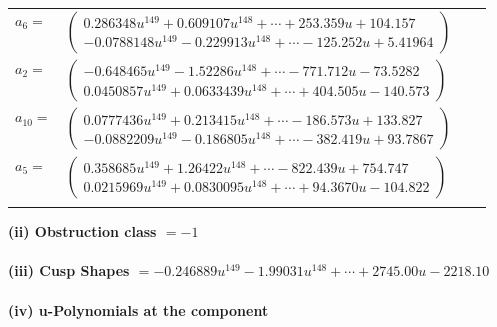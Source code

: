 \documentclass[1p]{elsarticle_modified}
\theoremstyle{definition}
\begin{document}
\begin{tabular}{m{7pt} m{180pt} m{7pt} m{180pt} }
\flushright $a_{6}=$&$\begin{pmatrix}0.286348 u^{149}+0.609107 u^{148}+\cdots+253.359 u+104.157\\-0.0788148 u^{149}-0.229913 u^{148}+\cdots-125.252 u+5.41964\end{pmatrix}$ \\
\flushright $a_{2}=$&$\begin{pmatrix}-0.648465 u^{149}-1.52286 u^{148}+\cdots-771.712 u-73.5282\\0.0450857 u^{149}+0.0633439 u^{148}+\cdots+404.505 u-140.573\end{pmatrix}$ \\
\flushright $a_{10}=$&$\begin{pmatrix}0.0777436 u^{149}+0.213415 u^{148}+\cdots-186.573 u+133.827\\-0.0882209 u^{149}-0.186805 u^{148}+\cdots-382.419 u+93.7867\end{pmatrix}$ \\
\flushright $a_{5}=$&$\begin{pmatrix}0.358685 u^{149}+1.26422 u^{148}+\cdots-822.439 u+754.747\\0.0215969 u^{149}+0.0830095 u^{148}+\cdots+94.3670 u-104.822\end{pmatrix}$\\&\end{tabular}
\flushleft \textbf{(ii) Obstruction class $= -1$}\\~\\
\flushleft \textbf{(iii) Cusp Shapes $= -0.246889 u^{149}-1.99031 u^{148}+\cdots+2745.00 u-2218.10$}\\~\\
\newpage\renewcommand{\arraystretch}{1}
\flushleft \textbf{(iv) u-Polynomials at the component}\newline \\
\end{document}
